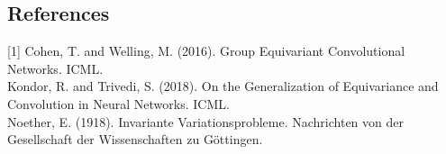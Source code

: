 \subsection*{References}
[1] Cohen, T. and Welling, M. (2016). Group Equivariant Convolutional Networks. ICML.\\
[2] Kondor, R. and Trivedi, S. (2018). On the Generalization of Equivariance and Convolution in Neural Networks. ICML.\\
[3] Noether, E. (1918). Invariante Variationsprobleme. Nachrichten von der Gesellschaft der Wissenschaften zu Göttingen.

